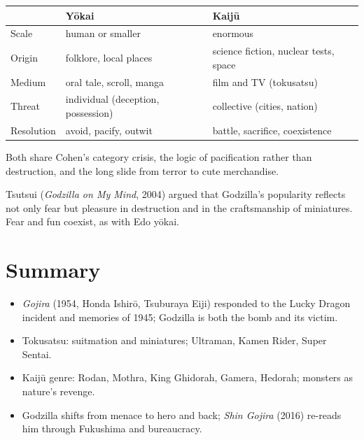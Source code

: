 \begin{center}
\begin{tabular}{p{3.2cm}p{4.8cm}p{4.8cm}}
\toprule
 & Yōkai & Kaijū \\
\midrule
Scale & human or smaller & enormous \\
Origin & folklore, local places & science fiction, nuclear tests, space \\
Medium & oral tale, scroll, manga & film and TV (tokusatsu) \\
Threat & individual (deception, possession) & collective (cities, nation) \\
Resolution & avoid, pacify, outwit & battle, sacrifice, coexistence \\
\bottomrule
\end{tabular}
\end{center}

Both share Cohen's category crisis, the logic of pacification rather than destruction, and
the long slide from terror to cute merchandise.

\begin{remark}
Tsutsui (\emph{Godzilla on My Mind}, 2004) argued that Godzilla's popularity reflects not
only fear but pleasure in destruction and in the craftsmanship of miniatures. Fear and
fun coexist, as with Edo yōkai.
\end{remark}

\section*{Summary}
\begin{itemize}
  \item \emph{Gojira} (1954, Honda Ishirō, Tsuburaya Eiji) responded to the Lucky Dragon
        incident and memories of 1945; Godzilla is both the bomb and its victim.
  \item Tokusatsu: suitmation and miniatures; Ultraman, Kamen Rider, Super Sentai.
  \item Kaijū genre: Rodan, Mothra, King Ghidorah, Gamera, Hedorah; monsters as nature's
        revenge.
  \item Godzilla shifts from menace to hero and back; \emph{Shin Gojira} (2016) re-reads him
        through Fukushima and bureaucracy.
\end{itemize}
